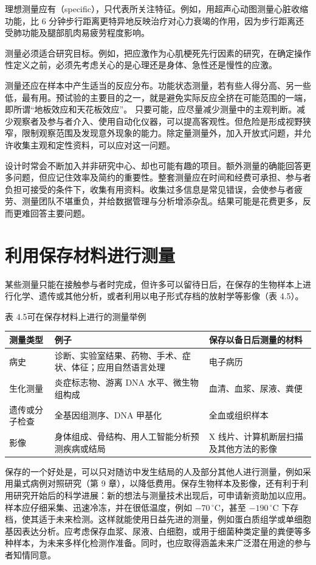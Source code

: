 理想测量应有（specific），只代表所关注特征。例如，用超声心动图测量心脏收缩功能，比 6 分钟步行距离更特异地反映治疗对心力衰竭的作用，因为步行距离还受肺功能及腿部肌肉易疲劳程度影响。

测量必须适合研究目标。例如，把应激作为心肌梗死先行因素的研究，在确定操作性定义之前，必须先考虑关心的是心理还是身体、急性还是慢性的应激。

测量还应在样本中产生适当的反应分布。功能状态测量，若有些人得分高、另一些低，最有用。预试验的主要目的之一，就是避免实际反应全挤在可能范围的一端，即所谓“地板效应和天花板效应”。
只要可能，应尽量减少测量中的主观判断。减少观察者及参与者介入、使用自动化仪器，可以提高客观性。但危险是形成视野狭窄，限制观察范围及发现意外现象的能力。除定量测量外，加入开放式问题，并允许收集主观和定性资料，可以应对这一问题。

设计时常会不断加入并非研究中心、却也可能有趣的项目。额外测量的确能回答更多问题，但应记住效率及简约的重要性。整套测量应在时间和经费可承担、参与者负担可接受的条件下，收集有用资料。收集过多信息是常见错误，会使参与者疲劳、测量团队不堪重负，并给数据管理与分析增添杂乱。结果可能是花费更多，反而更难回答主要问题。

\section{利用保存材料进行测量}
某些测量只能在接触参与者时完成，但许多可以留待日后，在保存的生物样本上进行化学、遗传或其他分析，或者利用以电子形式存档的放射学等影像（表 4.5）。
\begin{bookbox}{表 4.5\quad 可在保存材料上进行的测量举例}
\begin{tabularx}{\linewidth}{L{25mm}YY}
\toprule 测量类型 & 例子 & 保存以备日后测量的材料\\\midrule
病史 & 诊断、实验室结果、药物、手术、症状、体征；应用自然语言处理 & 电子病历\\
生化测量 & 炎症标志物、游离 DNA 水平、微生物组构成 & 血清、血浆、尿液、粪便\\
遗传或分子检查 & 全基因组测序、DNA 甲基化 & 全血或组织样本\\
影像 & 身体组成、骨结构、用人工智能分析预测疾病或结局 & X 线片、计算机断层扫描及其他方法的影像\\\bottomrule
\end{tabularx}
\end{bookbox}
保存的一个好处是，可以只对随访中发生结局的人及部分其他人进行测量，例如采用巢式病例对照研究（第 9 章），以降低费用。保存生物样本及影像，还有利于利用研究开始后的科学进展：新的想法与测量技术出现后，可申请新资助加以应用。样本应仔细采集、迅速冷冻，并在很低温度，例如 $-70\,^{\circ}\mathrm C$，甚至 $-190\,^{\circ}\mathrm C$ 下存档，使其适于未来检测。这样就能使用日益先进的测量，例如蛋白质组学或单细胞基因表达分析。应考虑保存血浆、尿液、白细胞，或用于细菌种类定量的粪便等多种样本，为未来多样化检测作准备。同时，也应取得涵盖未来广泛潜在用途的参与者知情同意。


